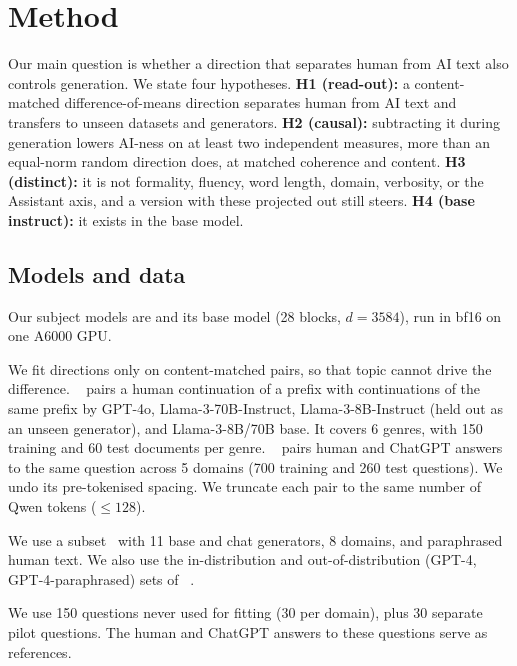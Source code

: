 \section{Method}
\label{sec:method}

Our main question is whether a direction that separates human from AI text also controls generation. We state four hypotheses.
{\bf H1 (read-out):} a content-matched difference-of-means direction separates human from AI text and transfers to unseen datasets and generators.
{\bf H2 (causal):} subtracting it during generation lowers AI-ness on at least two independent measures, more than an equal-norm random direction does, at matched coherence and content.
{\bf H3 (distinct):} it is not formality, fluency, word length, domain, verbosity, or the Assistant axis, and a version with these projected out still steers.
{\bf H4 (base \versus instruct):} it exists in the base model.

\subsection{Models and data}
 Our subject models are \qwen and its base model \qwenbase (28 blocks, $d=3584$), run in bf16 on one A6000 GPU.

 We fit directions only on content-matched pairs, so that topic cannot drive the difference.
\hape~\citep{reinhart2024hape} pairs a human continuation of a prefix with continuations of the same prefix by GPT-4o, Llama-3-70B-Instruct, Llama-3-8B-Instruct (held out as an unseen generator), and Llama-3-8B/70B base. It covers 6 genres, with 150 training and 60 test documents per genre.
\hcthree~\citep{guo2023hc3} pairs human and ChatGPT answers to the same question across 5 domains (700 training and 260 test questions). We undo its pre-tokenised spacing.
We truncate each pair to the same number of Qwen tokens ($\le 128$).

 We use a \raid subset~\citep{dugan2024raid} with 11 base and chat generators, 8 domains, and paraphrased human text. We also use the in-distribution and out-of-distribution (GPT-4, GPT-4-paraphrased) sets of \mage~\citep{li2024mage}.

 We use 150 \hcthree questions never used for fitting (30 per domain), plus 30 separate pilot questions. The human and ChatGPT answers to these questions serve as references.


